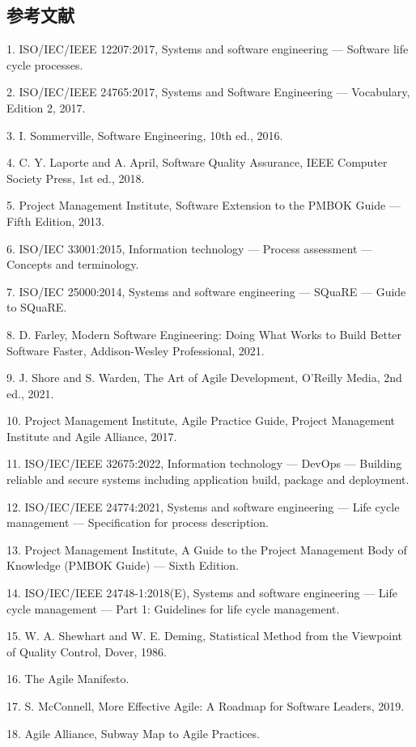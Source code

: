 \subsection{参考文献}
1. ISO/IEC/IEEE 12207:2017, Systems and software engineering — Software life cycle processes.

2. ISO/IEC/IEEE 24765:2017, Systems and Software Engineering — Vocabulary, Edition 2, 2017.

3. I. Sommerville, Software Engineering, 10th ed., 2016.

4. C. Y. Laporte and A. April, Software Quality Assurance, IEEE Computer Society Press, 1st ed., 2018.

5. Project Management Institute, Software Extension to the PMBOK Guide — Fifth Edition, 2013.

6. ISO/IEC 33001:2015, Information technology — Process assessment — Concepts and terminology.

7. ISO/IEC 25000:2014, Systems and software engineering — SQuaRE — Guide to SQuaRE.

8. D. Farley, Modern Software Engineering: Doing What Works to Build Better Software Faster, Addison-Wesley Professional, 2021.

9. J. Shore and S. Warden, The Art of Agile Development, O’Reilly Media, 2nd ed., 2021.

10. Project Management Institute, Agile Practice Guide, Project Management Institute and Agile Alliance, 2017.

11. ISO/IEC/IEEE 32675:2022, Information technology — DevOps — Building reliable and secure systems including application build, package and deployment.

12. ISO/IEC/IEEE 24774:2021, Systems and software engineering — Life cycle management — Specification for process description.

13. Project Management Institute, A Guide to the Project Management Body of Knowledge (PMBOK Guide) — Sixth Edition.

14. ISO/IEC/IEEE 24748-1:2018(E), Systems and software engineering — Life cycle management — Part 1: Guidelines for life cycle management.

15. W. A. Shewhart and W. E. Deming, Statistical Method from the Viewpoint of Quality Control, Dover, 1986.

16. The Agile Manifesto.

17. S. McConnell, More Effective Agile: A Roadmap for Software Leaders, 2019.

18. Agile Alliance, Subway Map to Agile Practices.

